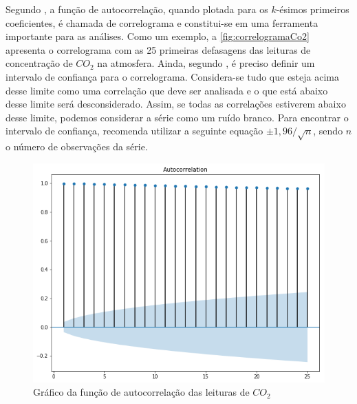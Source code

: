 \documentclass[
    12pt,
    oneside,
    a4paper,
    english,
    brazil
]{abntex2}
\begin{document}
Segundo  , a  função  de autocorrelação,  quando plotada  para os  $k$-ésimos  primeiros  coeficientes,  é chamada  de  correlograma e constitui-se em uma  ferramenta   importante  para  as  análises.  
Como um exemplo, a \autoref{fig:correlogramaCo2} apresenta o correlograma com as 25 primeiras defasagens das leituras  de concentração de $CO_2$ na  atmosfera. Ainda, segundo , é preciso definir um intervalo  de confiança para o correlograma. 
Considera-se tudo que esteja acima desse limite como uma correlação que deve ser analisada e o que está abaixo desse limite será desconsiderado. Assim, se todas as correlações estiverem abaixo desse limite, podemos considerar a série como um  ruído branco. 
Para encontrar o intervalo de confiança,  recomenda utilizar a seguinte equação  $\pm{}1,96/\sqrt{n}$, sendo $n$ o número de observações da série.



\begin{figure}
    \centering
    \caption{Gráfico da função de autocorrelação das leituras de
        $CO_2$}\label{fig:correlogramaCo2}
    \includegraphics[width=.6\linewidth]{images/acf_co2.png}
\end{figure}
\end{document}
